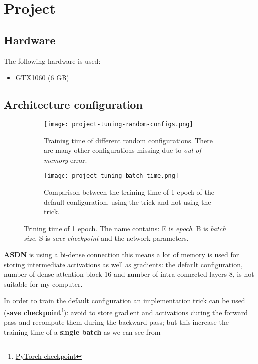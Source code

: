 \section{Project}

\subsection{Hardware}
The following hardware is used:
\begin{itemize}
    \item GTX1060 (6 GB)
\end{itemize}

\subsection{Architecture configuration}
\begin{figure}
    \begin{subfigure}{\textwidth}
        \centering
        \texttt{[image: project-tuning-random-configs.png]}
        \caption{Training time of different random configurations. There are many other configurations missing due to \textit{out of memory} error.}\label{project:random-configurations}
    \end{subfigure}
    \begin{subfigure}{\textwidth}
        \centering
        \texttt{[image: project-tuning-batch-time.png]}        
        \caption{Comparison between the training time of 1 epoch of the default configuration, using the trick and not using the trick.}\label{project:batch-time}
    \end{subfigure}

    \caption{Trining time of 1 epoch. The name contains: E is \textit{epoch}, B is \textit{batch size}, S is \textit{save checkpoint} and the network parameters.}    
\end{figure}

\textbf{ASDN} is using a bi-dense connection this means a lot of memory is used for storing intermediate activations as well as gradients: the default configuration, number of dense attention block 16 and number of intra connected layers 8, is not suitable for my computer.

In order to train the default configuration an implementation trick can be used (\textbf{save checkpoint}\footnote{\href{https://pytorch.org/docs/stable/checkpoint.html}{PyTorch checkpoint}}): avoid to store gradient and activations during the forward pass and recompute them during the backward pass; but this increase the training time of a \textbf{single batch} as we can see from 

